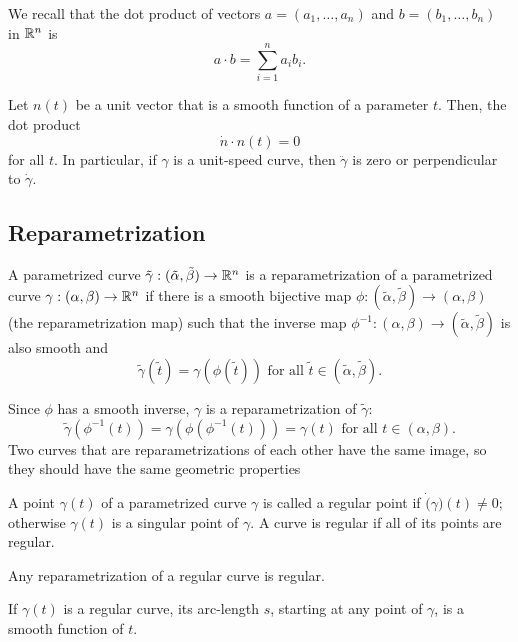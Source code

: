 We recall that the dot product of vectors
$a = (a_1, \dots, a_n)$ and
$b = (b_1, \dots, b_n)$ in $\mathbb{R}^n$ is
\[
  a \cdot b = \sum_{i = 1}^n a_i b_i.
\]

\begin{proposition}
  Let $n(t)$ be a unit vector that is a smooth function of a parameter $t$.
  Then, the dot product
  \[
    \dot{n} \cdot n(t) = 0  
  \]
  for all $t$. In particular, if $\gamma$ is a unit-speed curve,
  then $\ddot{\gamma}$ is zero or perpendicular to $\dot{\gamma}$.
\end{proposition}

\subsection{Reparametrization}

\begin{defn}
  A parametrized curve $\tilde \gamma: (\tilde \alpha, \tilde \beta) \to \mathbb{R}^n$
  is a reparametrization of a parametrized curve $\gamma: (\alpha, \beta) \to \mathbb{R}^n$
  if there is a smooth bijective map $\phi: (\tilde \alpha, \tilde \beta) \to (\alpha, \beta)$
  (the reparametrization map) such that the inverse map $\phi^{-1}: (\alpha, \beta) \to (\tilde \alpha, \tilde \beta)$
  is also smooth and
  \[
    \tilde \gamma(\tilde t) = \gamma(\phi(\tilde t)) \text{ for all } \tilde t \in (\tilde \alpha, \tilde \beta).
  \]
\end{defn}

\begin{note}
  Since $\phi$ has a smooth inverse, $\gamma$ is a reparametrization of $\tilde \gamma$:
  \[
    \tilde \gamma(\phi^{-1}(t)) = \gamma(\phi(\phi^{-1}(t))) = \gamma(t) \text{ for all } t \in (\alpha, \beta).
  \]
  Two curves that are reparametrizations of each other have the same image, so they should have the same geometric properties
\end{note}

\begin{defn}
  A point $\gamma(t)$ of a parametrized curve $\gamma$ is called a regular point
  if $\dot(\gamma)(t) \neq 0$; otherwise $\gamma(t)$ is a singular point of $\gamma$.
  A curve is regular if all of its points are regular.
\end{defn}

\begin{proposition}
  Any reparametrization of a regular curve is regular.
\end{proposition}

\begin{proposition}
  If $\gamma(t)$ is a regular curve, its arc-length $s$,
  starting at any point of $\gamma$, is a smooth function of $t$.
\end{proposition}

